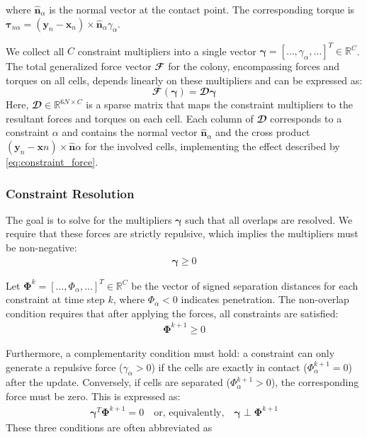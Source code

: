 \documentclass[conference]{IEEEtran}
\begin{document}
where $\hat{\mathbf{n}}_\alpha$ is the normal vector at the contact point. The corresponding torque is $\boldsymbol{\tau}_{n\alpha} = (\mathbf{y}_n - \mathbf{x}_n) \times \hat{\mathbf{n}}_\alpha \gamma_\alpha$.

We collect all $C$ constraint multipliers into a single vector $\boldsymbol{\gamma} = [\dots, \gamma_\alpha, \dots]^T \in \mathbb{R}^{C}$. The total generalized force vector $\mathbfcal{F}$ for the colony, encompassing forces and torques on all cells, depends linearly on these multipliers and can be expressed as:
\begin{equation}
    \mathbfcal{F}(\boldsymbol{\gamma}) = \mathbfcal{D} \boldsymbol{\gamma}
\end{equation}
Here, $\mathbfcal{D} \in \mathbb{R}^{6N \times C}$ is a sparse matrix that maps the constraint multipliers to the resultant forces and torques on each cell. Each column of $\mathbfcal{D}$ corresponds to a constraint $\alpha$ and contains the normal vector $\hat{\mathbf{n}}_\alpha$ and the cross product $(\mathbf{y}_n - \mathbf{x}n) \times \hat{\mathbf{n}}\alpha$ for the involved cells, implementing the effect described by \autoref{eq:constraint_force}.

\subsubsection{Constraint Resolution}

The goal is to solve for the multipliers $\boldsymbol{\gamma}$ such that all overlaps are resolved. We require that these forces are strictly repulsive, which implies the multipliers must be non-negative:
\begin{align}
    \boldsymbol{\gamma} \geq 0
\end{align}

Let $\mathbf{\Phi}^k = [\dots, \Phi_\alpha, \dots]^T \in \mathbb{R}^{C}$ be the vector of signed separation distances for each constraint at time step $k$, where $\Phi_\alpha < 0$ indicates penetration. The non-overlap condition requires that after applying the forces, all constraints are satisfied:
\begin{align}
    \mathbf{\Phi}^{k+1} \geq 0
\end{align}

Furthermore, a complementarity condition must hold: a constraint can only generate a repulsive force ($\gamma_\alpha > 0$) if the cells are exactly in contact ($\Phi_\alpha^{k+1} = 0$) after the update. Conversely, if cells are separated ($\Phi_\alpha^{k+1} > 0$), the corresponding force must be zero. This is expressed as:
\begin{align}
    \boldsymbol{\gamma}^T \mathbf{\Phi}^{k+1} = 0 \quad \text{or, equivalently,} \quad \boldsymbol{\gamma} \perp \mathbf{\Phi}^{k+1}
\end{align}
These three conditions are often abbreviated as
\end{document}
